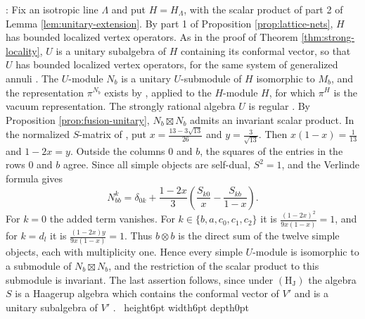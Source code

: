 \documentclass[leqno]{article}
\newcommand{\qed}{\hfill \vrule height6pt  width6pt depth0pt}
\newcommand{\ot}{\otimes}
\newenvironment{proof}[1][]{\noindent {\it Proof #1} : }{\hbox{~}\qed
\smallskip
}
\numberwithin{equation}{section}
\begin{document}
\begin{proof}
Fix an isotropic line $\Lambda$ and put $H = H_\Lambda$, with the scalar product of part 2 of Lemma \ref{lem:unitary-extension}. By part 1 of Proposition \ref{prop:lattice-nets}, $H$ has bounded localized vertex operators. As in the proof of Theorem \ref{thm:strong-locality}, $U$ is a unitary subalgebra of $H$ containing its conformal vector, so that $U$ has bounded localized vertex operators, for the same system of generalized annuli \cite[Proposition 4.16 p.~43]{Ten19a}. The $U$-module $N_b$ is a unitary $U$-submodule of $H$ isomorphic to $M_b$, and the representation $\pi^{N_b}$ exists by \cite[Theorem 5.6 p.~52]{Ten19a}, applied to the $H$-module $H$, for which $\pi^H$ is the vacuum representation. The strongly rational algebra $U$ is regular \cite[Theorem 4.5]{ABD04}. By Proposition \ref{prop:fusion-unitary}, $N_b \boxtimes N_b$ admits an invariant scalar product. In the normalized $S$-matrix of \cite[(2.5a)--(2.5b) p.~20]{EvG11}, put $x = \frac{13-3\sqrt{13}}{26}$ and $y = \frac3{\sqrt{13}}$. Then $x(1-x) = \frac1{13}$ and $1-2x = y$. Outside the columns $0$ and $b$, the squares of the entries in the rows $0$ and $b$ agree. Since all simple objects are self-dual, $S^2 = 1$, and the Verlinde formula gives
\[
N_{bb}^k = \delta_{0k}+\frac{1-2x}{3}\left(\frac{S_{k0}}{x}-\frac{S_{kb}}{1-x}\right).
\]
For $k = 0$ the added term vanishes. For $k \in \{b,a,c_0,c_1,c_2\}$ it is $\frac{(1-2x)^2}{9x(1-x)} = 1$, and for $k = d_l$ it is $\frac{(1-2x)y}{9x(1-x)} = 1$. Thus $b \ot b$ is the direct sum of the twelve simple objects, each with multiplicity one. Hence every simple $U$-module is isomorphic to a submodule of $N_b \boxtimes N_b$, and the restriction of the scalar product to this submodule is invariant. The last assertion follows, since under $\mathrm{(H_J)}$ the algebra $S$ is a Haagerup algebra which contains the conformal vector of $V'$ and is a unitary subalgebra of $V'$ \cite[Theorem 10.10 and Theorem 10.24]{Arh26}.
\end{proof}
\end{document}
